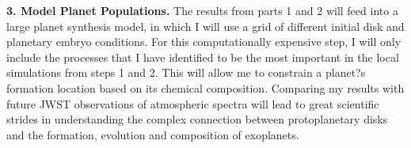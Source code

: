 \documentclass[12pt, letterpaper]{article}
\begin{document}
\textbf{3. Model Planet Populations.} The results from parts 1 and 2 will feed into a large planet synthesis model, in which I will use a grid of different initial disk and planetary embryo conditions. For this computationally expensive step, I will only include the processes that I have identified to be the most important in the local simulations from steps 1 and 2. This will allow me to constrain a planet?s formation location based on its chemical composition. Comparing my results with future JWST observations of atmospheric spectra will lead to great scientific strides in understanding the complex connection between protoplanetary disks and the formation, evolution and composition of exoplanets.



%

\footnotesize
\end{document}
